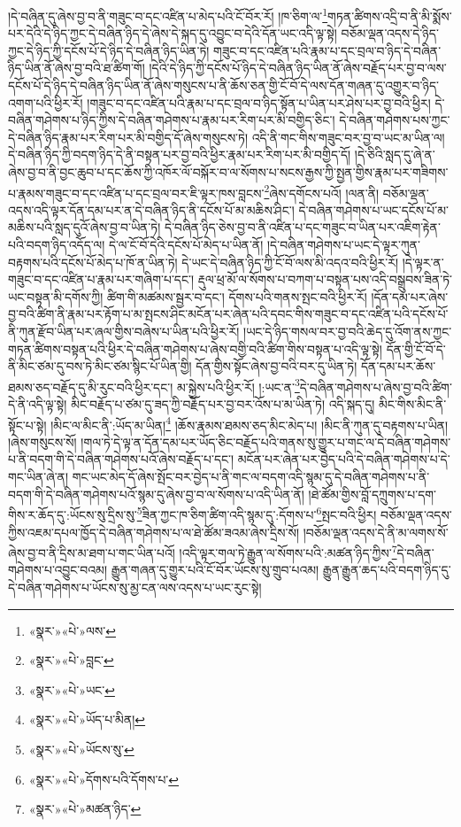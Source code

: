 །དེ་བཞིན་དུ་ཞེས་བྱ་བ་ནི་གཟུང་བ་དང་འཛིན་པ་མེད་པའི་ངོ་བོར་རོ། །ཁ་ཅིག་ལ་\footnote{«སྣར་»«པེ་»ལས་}གཏན་ཚིགས་འདྲི་བ་ནི་མི་སྨོས་པར་དེའི་དེ་ཉིད་ཀྱང་དེ་བཞིན་ཉིད་དེ་ཞེས་དེ་སྐད་དུ་འབྱུང་བ་དེའི་དོན་ཡང་འདི་ལྟ་སྟེ། བཅོམ་ལྡན་འདས་དེ་ཉིད་ཀྱང་དེ་ཉིད་ཀྱི་དངོས་པོ་དེ་ཉིད་དེ་བཞིན་ཉིད་ཡིན་ཏེ། གཟུང་བ་དང་འཛིན་པའི་རྣམ་པ་དང་བྲལ་བ་ཉིད་དེ་བཞིན་ཉིད་ཡིན་ནོ་ཞེས་བྱ་བའི་ཐ་ཚིག་གོ། །དེའི་དེ་ཉིད་ཀྱི་དངོས་པོ་ཉིད་དེ་བཞིན་ཉིད་ཡིན་ནོ་ཞེས་བརྗོད་པར་བྱ་བ་ལས་དངོས་པོ་དེ་ཉིད་དེ་བཞིན་ཉིད་ཡིན་ནོ་ཞེས་གསུངས་པ་ནི་ཆོས་ཅན་གྱི་ངོ་བོ་དེ་ལས་དོན་གཞན་དུ་འགྱུར་བ་ཉིད་འགག་པའི་ཕྱིར་རོ། །གཟུང་བ་དང་འཛིན་པའི་རྣམ་པ་དང་བྲལ་བ་ཉིད་སྟོན་པ་ཡིན་པར་ཤེས་པར་བྱ་བའི་ཕྱིར། དེ་བཞིན་གཤེགས་པ་ཉིད་ཀྱིས་དེ་བཞིན་གཤེགས་པ་རྣམ་པར་རིག་པར་མི་བགྱིད་ཅིང་། དེ་བཞིན་གཤེགས་པས་ཀྱང་དེ་བཞིན་ཉིད་རྣམ་པར་རིག་པར་མི་བགྱིད་དོ་ཞེས་གསུངས་ཏེ། འདི་ནི་གང་གིས་གཟུང་བར་བྱ་བ་ཡང་མ་ཡིན་ལ། དེ་བཞིན་ཉིད་ཀྱི་བདག་ཉིད་དེ་ནི་བསྟན་པར་བྱ་བའི་ཕྱིར་རྣམ་པར་རིག་པར་མི་བགྱིད་དོ། །དེ་ཅིའི་སླད་དུ་ཞེ་ན་ཞེས་བྱ་བ་ནི་བྱང་ཆུབ་པ་དང་ཆོས་ཀྱི་འཁོར་ལོ་བསྐོར་བ་ལ་སོགས་པ་སངས་རྒྱས་ཀྱི་སྤྱན་གྱིས་རྣམ་པར་གཟིགས་པ་རྣམས་གཟུང་བ་དང་འཛིན་པ་དང་བྲལ་བར་ཇི་ལྟར་ཁས་བླངས་\footnote{«སྣར་»«པེ་»བླང་}ཞེས་དགོངས་པའོ། །ལན་ནི། བཅོམ་ལྡན་འདས་འདི་ལྟར་དོན་དམ་པར་ན་དེ་བཞིན་ཉིད་ནི་དངོས་པོ་མ་མཆིས་ཤིང་། དེ་བཞིན་གཤེགས་པ་ཡང་དངོས་པོ་མ་མཆིས་པའི་སླད་དུའོ་ཞེས་བྱ་བ་ཡིན་ཏེ། དེ་བཞིན་ཉིད་ཅེས་བྱ་བ་ནི་འཛིན་པ་དང་གཟུང་བ་ཡིན་པར་འཇིག་རྟེན་པའི་བདག་ཉིད་འདོད་ལ། དེ་ལ་ངོ་བོ་དེའི་དངོས་པོ་མེད་པ་ཡིན་ནོ། །དེ་བཞིན་གཤེགས་པ་ཡང་དེ་ལྟར་ཀུན་བརྟགས་པའི་དངོས་པོ་མེད་པ་ཁོ་ན་ཡིན་ཏེ། དེ་ཡང་དེ་བཞིན་ཉིད་ཀྱི་ངོ་བོ་ལས་མི་འདའ་བའི་ཕྱིར་རོ། །དེ་ལྟར་ན་གཟུང་བ་དང་འཛིན་པ་རྣམ་པར་གཞིག་པ་དང་། རྡུལ་ཕྲ་མོ་ལ་སོགས་པ་བཀག་པ་བསྟན་པས་འདི་བསྒྲུབས་ཟིན་ཏེ་ཡང་བསྟན་མི་དགོས་ཀྱི། ཚིག་གི་མཚམས་སྦྱར་བ་དང་། དོགས་པའི་གནས་སྤང་བའི་ཕྱིར་རོ། །དོན་དམ་པར་ཞེས་བྱ་བའི་ཚིག་ནི་རྣམ་པར་རྟོག་པ་མ་སྤངས་ཤིང་མངོན་པར་ཞེན་པའི་དབང་གིས་གཟུང་བ་དང་འཛིན་པའི་དངོས་པོ་ནི་ཀུན་རྫོབ་ཡིན་པར་ཞལ་གྱིས་བཞེས་པ་ཡིན་པའི་ཕྱིར་རོ། །ཡང་དེ་ཉིད་གསལ་བར་བྱ་བའི་ཆེད་དུ་འོག་ནས་ཀྱང་གཏན་ཚིགས་བསྟན་པའི་ཕྱིར་དེ་བཞིན་གཤེགས་པ་ཞེས་བགྱི་བའི་ཚིག་གིས་བསྟན་པ་འདི་ལྟ་སྟེ། དོན་གྱི་ངོ་བོ་དེ་ནི་མིང་ཙམ་དུ་བས་ཏེ་མིང་ཙམ་སྙིང་པོ་ཡིན་གྱི། དོན་གྱིས་སྟོང་ཞེས་བྱ་བའི་བར་དུ་ཡིན་ཏེ། དོན་དམ་པར་ཆོས་ཐམས་ཅད་བརྗོད་དུ་མི་རུང་བའི་ཕྱིར་དང་། མ་སྐྱེས་པའི་ཕྱིར་རོ། །:ཡང་ན་\footnote{«སྣར་»«པེ་»ཡང་}དེ་བཞིན་གཤེགས་པ་ཞེས་བྱ་བའི་ཚིག་དེ་ནི་འདི་ལྟ་སྟེ། མིང་བརྗོད་པ་ཙམ་དུ་ཟད་ཀྱི་བརྗོད་པར་བྱ་བར་འོས་པ་མ་ཡིན་ཏེ། འདི་སྐད་དུ། མིང་གིས་མིང་ནི་སྟོང་པ་སྟེ། །མིང་ལ་མིང་ནི་:ཡོད་མ་ཡིན།\footnote{«སྣར་»«པེ་»ཡོད་པ་མིན།} །ཆོས་རྣམས་ཐམས་ཅད་མིང་མེད་པ། །མིང་ནི་ཀུན་དུ་བརྟགས་པ་ཡིན། །ཞེས་གསུངས་སོ། །གལ་ཏེ་དེ་ལྟ་ན་དོན་དམ་པར་ཡོད་ཅིང་བརྗོད་པའི་གནས་སུ་གྱུར་པ་གང་ལ་དེ་བཞིན་གཤེགས་པ་ནི་བདག་གི་དེ་བཞིན་གཤེགས་པའོ་ཞེས་བརྗོད་པ་དང་། མངོན་པར་ཞེན་པར་བྱེད་པའི་དེ་བཞིན་གཤེགས་པ་དེ་གང་ཡིན་ཞེ་ན། གང་ཡང་མེད་དོ་ཞེས་སྤོང་བར་བྱེད་པ་ནི་གང་ལ་བདག་འདི་སྙམ་དུ་དེ་བཞིན་གཤེགས་པ་ནི་བདག་གི་དེ་བཞིན་གཤེགས་པའོ་སྙམ་དུ་ཞེས་བྱ་བ་ལ་སོགས་པ་འདི་ཡིན་ནོ། །ཐེ་ཚོམ་གྱིས་བློ་དཀྲུགས་པ་དག་གིས་ར་ཆོད་དུ་:ཡོངས་སུ་དྲིས་སུ་\footnote{«སྣར་»«པེ་»ཡོངས་སུ་}ཟིན་ཀྱང་ཁ་ཅིག་ཚིག་འདི་སྙམ་དུ་:དོགས་པ་\footnote{«སྣར་»«པེ་»དོགས་པའི་དོགས་པ་}སྤང་བའི་ཕྱིར། བཅོམ་ལྡན་འདས་ཀྱིས་འཇམ་དཔལ་ཁྱོད་དེ་བཞིན་གཤེགས་པ་ལ་ཐེ་ཚོམ་ཟའམ་ཞེས་དྲིས་སོ། །བཅོམ་ལྡན་འདས་དེ་ནི་མ་ལགས་སོ་ཞེས་བྱ་བ་ནི་དྲིས་མ་ཐག་པ་གང་ཡིན་པའོ། །འདི་ལྟར་གལ་ཏེ་རྒྱུན་ལ་སོགས་པའི་:མཚན་ཉིད་ཀྱིས་\footnote{«སྣར་»«པེ་»མཚན་ཉིད་}དེ་བཞིན་གཤེགས་པ་འབྱུང་བའམ། རྒྱུན་གཞན་དུ་གྱུར་པའི་ངོ་བོར་ཡོངས་སུ་གྲུབ་པའམ། རྒྱུན་རྒྱུན་ཆད་པའི་བདག་ཉིད་དུ་དེ་བཞིན་གཤེགས་པ་ཡོངས་སུ་མྱ་ངན་ལས་འདས་པ་ཡང་རུང་སྟེ། 